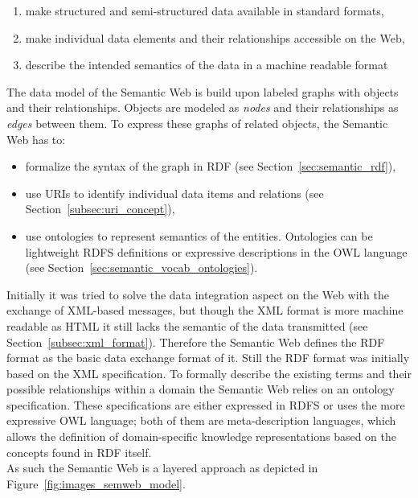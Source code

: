 \begin{enumerate}
	\item make structured and semi-structured data available in standard formats,
	\item make individual data elements and their relationships accessible on the Web,
	\item describe the intended semantics of the data in a machine readable format
\end{enumerate}

The data model of the Semantic Web is build upon labeled graphs with objects and their relationships. Objects are modeled as \emph{nodes} and their relationships as \emph{edges} between them. To express these graphs of related objects, the Semantic Web has to: \@

\begin{itemize}
	\item formalize the syntax of the graph in \gls{RDF} (see Section~\ref{sec:semantic_rdf}),
	\item use \gls{URI}s to identify individual data items and relations (see Section~\ref{subsec:uri_concept}),
	\item use ontologies to represent semantics of the entities. Ontologies can be lightweight \gls{RDFS} definitions or expressive descriptions in the \gls{OWL} language (see Section~\ref{sec:semantic_vocab_ontologies}).
\end{itemize}

Initially it was tried to solve the data integration aspect on the Web with the exchange of \gls{XML}-based messages, but though the \gls{XML} format is more machine readable as \gls{HTML} it still lacks the semantic of the data transmitted (see Section~\ref{subsec:xml_format}). Therefore the Semantic Web defines the \gls{RDF} format as the basic data exchange format of it. Still the \gls{RDF} format was initially based on the \gls{XML} specification. To formally describe the existing terms and their possible relationships within a domain the Semantic Web relies on an ontology specification. These specifications are either expressed in \gls{RDFS} or uses the more expressive \gls{OWL} language; both of them are meta-description languages, which allows the definition of domain-specific knowledge representations based on the concepts found in \gls{RDF} itself. \\

As such the Semantic Web is a layered approach as depicted in Figure~\ref{fig:images_semweb_model}.\@

